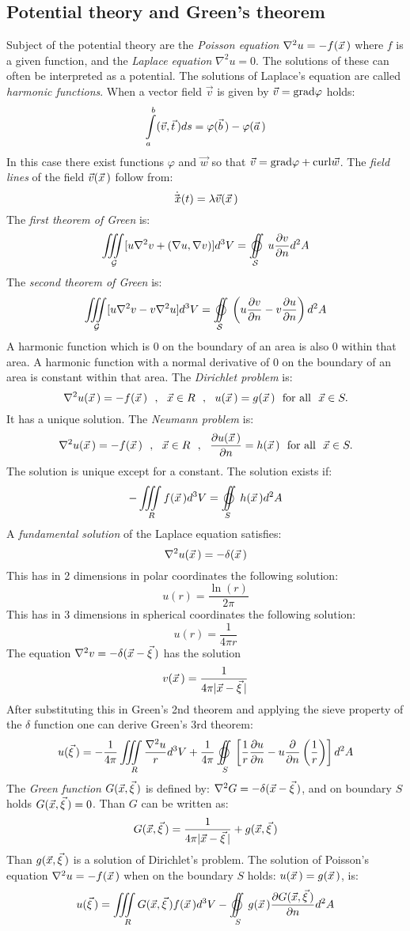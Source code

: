 \documentclass[a4paper,fancyheadings,twoside]{report}
\begin{document}
\subsection{Potential theory and Green's theorem}
Subject of the potential theory are the {\it Poisson equation}
$\nabla^2u=-f(\vec{x}\,)$ where $f$ is a given function, and the {\it Laplace
equation} $\nabla^2u=0$. The solutions of these can often be interpreted as
a potential. The solutions of Laplace's equation are called {\it harmonic
functions}.
\npar
When a vector field $\vec{v}$ is given by $\vec{v}={\rm grad}\varphi$
holds:
\[
\int\limits_a^b(\vec{v},\vec{t}\,)ds=\varphi(\vec{b}\,)-\varphi(\vec{a}\,)
\]
In this case there exist functions $\varphi$ and $\vec{w}$ so that
$\vec{v}={\rm grad}\varphi+{\rm curl}\vec{w}$.
\npar
The {\it field lines} of the field $\vec{v}(\vec{x}\,)$ follow from:
\[
\dot{\vec{x}\,}(t)=\lambda\vec{v}(\vec{x}\,)
\]
The {\it first theorem of Green} is:
\[
\iiint\limits_{\cal\!\!\! G}[u\nabla^2v+(\nabla u,\nabla v)]d^3V=\mathop{\oiint}\limits_{\cal\!\!\! S}u\Q{v}{n}d^2A
\]
The {\it second theorem of Green} is:
\[
\iiint\limits_{\cal\!\!\! G}[u\nabla^2v-v\nabla^2u]d^3V=\mathop{\oiint}\limits_{\cal\!\!\! S}\left(u\Q{v}{n}-v\Q{u}{n}\right)d^2A
\]
A harmonic function which is 0 on the boundary of an area is also 0 within that
area. A harmonic function with a normal derivative of 0 on the boundary of an
area is constant within that area.
\npar
The {\it Dirichlet problem} is:
\[
\nabla^2u(\vec{x}\,)=-f(\vec{x}\,)~~,~~\vec{x}\in R~~,~~u(\vec{x}\,)=g(\vec{x}\,)~~\mbox{for all}~~\vec{x}\in S.
\]
It has a unique solution.
\npar
The {\it Neumann problem} is:
\[
\nabla^2u(\vec{x}\,)=-f(\vec{x}\,)~~,~~\vec{x}\in R~~,~~\frac{\partial u(\vec{x}\,)}{\partial n}=h(\vec{x}\,)~~\mbox{for all}~~\vec{x}\in S.
\]
The solution is unique except for a constant. The solution exists if:
\[
-\iiint\limits_{\!\!\!R}f(\vvec{x})d^3V=\mathop{\oiint}_{\!\!\!S}h(\vvec{x})d^2A
\]
A {\it fundamental solution} of the Laplace equation satisfies:
\[
\nabla^2u(\vec{x}\,)=-\delta(\vec{x}\,)
\]
This has in 2 dimensions in polar coordinates the following solution:
\[
u(r)=\frac{\ln(r)}{2\pi}
\]
This has in 3 dimensions in spherical coordinates the following solution:
\[
u(r)=\frac{1}{4\pi r}
\]
The equation $\nabla^2v=-\delta(\vec{x}-\vec{\xi}\,)$ has the solution
\[
v(\vec{x}\,)=\frac{1}{4\pi|\vec{x}-\vec{\xi}\,|}
\]
After substituting this in Green's 2nd theorem and applying the sieve
property of the $\delta$ function one can derive Green's 3rd theorem:
\[
u(\vvec{\xi})=-\frac{1}{4\pi}\iiint\limits_R\frac{\nabla^2u}{r}d^3V+
\frac{1}{4\pi}\mathop{\oiint}\limits_S\left[\frac{1}{r}\Q{u}{n}-u\Q{}{n}\left(\frac{1}{r}\right)\right]d^2A
\]
The {\it Green function} $G(\vec{x},\vec{\xi}\,)$ is defined by:
$\nabla^2G=-\delta(\vec{x}-\vec{\xi}\,)$, and on boundary $S$ holds
$G(\vec{x},\vec{\xi}\,)=0$. Than $G$ can be written as:
\[
G(\vec{x},\vec{\xi}\,)=\frac{1}{4\pi|\vec{x}-\vec{\xi}\,|}+g(\vec{x},\vec{\xi}\,)
\]
Than $g(\vec{x},\vec{\xi}\,)$ is a solution of Dirichlet's problem. The solution
of Poisson's equation $\nabla^2u=-f(\vec{x}\,)$ when on the boundary $S$ holds:
$u(\vec{x}\,)=g(\vec{x}\,)$, is:
\[
u(\vvec{\xi})=\iiint\limits_RG(\vec{x},\vvec{\xi})f(\vvec{x})d^3V-
\mathop{\oiint}\limits_Sg(\vvec{x})\Q{G(\vec{x},\vvec{\xi})}{n}d^2A
\]
\end{document}
